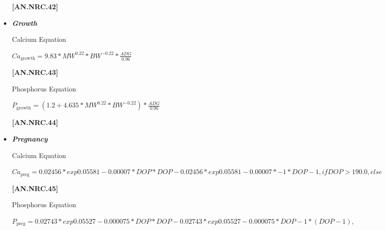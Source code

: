 \documentclass{article}
\begin{document}
\begin{refsection}
\begin{itemize}
\vspace{0.5cm}
            {\raggedleft \textbf{[AN.NRC.42]}\par}
\vspace{0.5cm}

        \item \textbf{\textit{Growth}} 
\vspace{0.2cm}

Calcium Equation
\begin{center}
    \(Ca_{\text{growth}} = 9.83 * MW^{0.22} * BW^{-0.22} * \frac{ADG}{0.96}\)
\end{center}

\vspace{0.5cm}
            {\raggedleft \textbf{[AN.NRC.43]}\par}
            
\vspace{0.5cm}
Phosphorus Equation
\vspace{0.2cm}
                
\begin{center}
    \(P_{\text{growth}} = (1.2 + 4.635 * MW^{0.22} * BW^{-0.22}) * \frac{ADG}{0.96} \) 
\end{center}
\vspace{0.5cm}
            {\raggedleft \textbf{[AN.NRC.44]}\par}
\vspace{0.5cm}

            
        \item \textbf{\textit{Pregnancy}}  
\vspace{0.2cm}

Calcium Equation

\begin{center}
    \(Ca_{\text{preg}} = 0.02456 * exp0.05581 - 0.00007 * DOP * DOP - 0.02456 * exp0.05581 - 0.00007 * - 1 * DOP - 1, if DOP > 190.0, else\)
\end{center}

\vspace{0.5cm}
            {\raggedleft \textbf{[AN.NRC.45]}\par}
\vspace{0.5cm}

Phosphorus Equation
                
\begin{center}
    \(P_{\text{preg}} = 0.02743 * exp 0.05527 - 0.000075 * DOP * DOP - 0.02743 * exp0.05527 - 0.000075 * DOP - 1 * (DOP - 1),\) \\
    \vspace{0.2cm}
    

\end{center}
\end{itemize}
\end{refsection}
\end{document}
